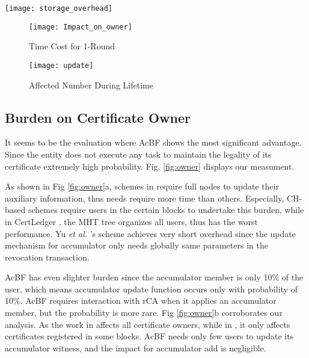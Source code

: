 \documentclass[conference]{IEEEtran}
\begin{document}
 \begin{figure*}[!htb]
    \centering
    \begin{minipage}{.35\textwidth}
        \centering
        \texttt{[image: storage\_overhead]}
        \caption{Storage on Verifier for Revocation}
        \label{fig:withBF}
    \end{minipage}%
    \begin{minipage}{0.64\textwidth}
		\begin{subfigure}[b]{0.49\textwidth}
			\centering
			\texttt{[image: Impact\_on\_owner]}
			\caption{Time Cost for 1-Round}
			\label{fig:owner_time}
		\end{subfigure}
		\begin{subfigure}[b]{0.49\textwidth}
			\centering
			\texttt{[image: update]}
			\caption{Affected Number During Lifetime}
			\label{fig:owner_number}
		\end{subfigure}
        \caption{Evaluation Result on Owners' Reaction for Revocation}
        \label{fig:owner}	
    \end{minipage}
\end{figure*}

\subsection{Burden on Certificate Owner}

It seems to be the evaluation where AcBF shows the most significant advantage. Since the entity does not execute any task to maintain the legality of its certificate extremely high probability. Fig. \ref{fig:owner} displays our measument.

As shown in Fig \ref{fig:owner}a, schemes in \cite{luoScalaCertScalabilityOrientedPKI2022a,certledger, jia2021process} require full nodes to update their auxiliary information, thus needs require more time than others. Especially, CH-based schemes require users in the certain blocks to undertake this burden, while in CertLedger \cite{certledger}, the MHT tree organizes all users, thus has the worst performance. Yu \textit{et al.} \cite{yu2019blockchain}'s scheme achieves very short overhead since the update mechanism for accumulator only needs globally same parameters in the revocation transaction. 

AcBF has even slighter burden since the accumulator member is only 10\% of the user, which means accumulator update function occurs only with probability of 10\%. AcBF requires interaction with rCA when it applies an accumulator member, but the probability is more rare. Fig \ref{fig:owner}b corroborates our analysis. As the work in \cite{yu2019blockchain} affects all certificate owners, while in \cite{luoScalaCertScalabilityOrientedPKI2022a,jia2021process}, it only affects certificates registered in some blocks. AcBF needs only few users to update its accumulator witness, and the impact for accumulator add is negligible. 
\end{document}
